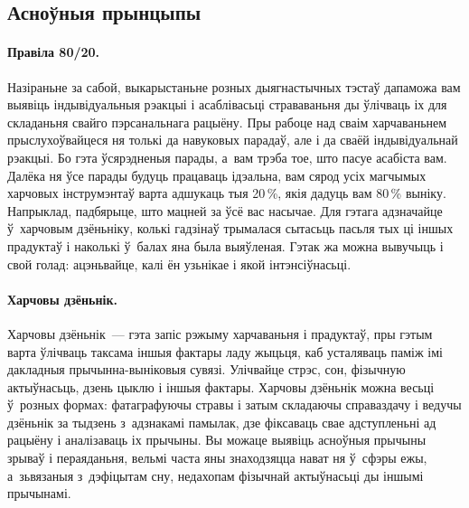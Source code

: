 \subsection{Асноўныя прынцыпы}

\paragraph{Правіла 80/20.}
Назіраньне за сабой, выкарыстаньне розных дыягнастычных тэстаў дапаможа вам выявіць індывідуальныя рэакцыі і асаблівасьці страваваньня ды ўлічваць іх для складаньня свайго пэрсанальнага рацыёну. Пры рабоце над сваім харчаваньнем прыслухоўвайцеся ня толькі да навуковых парадаў, але і да сваёй індывідуальнай рэакцыі. Бо гэта ўсярэдненыя парады, а~вам трэба тое, што пасуе асабіста вам. Далёка ня ўсе парады будуць працаваць ідэальна, вам сярод усіх магчымых харчовых інструмэнтаў варта адшукаць тыя 20\,\%, якія дадуць вам 80\,\% выніку. Напрыклад, падбярыце, што мацней за ўсё вас насычае. Для гэтага адзначайце ў~харчовым дзёньніку, колькі гадзінаў трымалася сытасьць пасьля тых ці іншых прадуктаў і наколькі ў~балах яна была выяўленая. Гэтак жа можна вывучыць і свой голад: ацэньвайце, калі ён узьнікае і якой інтэнсіўнасьці.

\paragraph{Харчовы дзёньнік.}
Харчовы дзёньнік~--- гэта запіс рэжыму харчаваньня і прадуктаў, пры гэтым варта ўлічваць таксама іншыя фактары ладу жыцьця, каб усталяваць паміж імі дакладныя прычынна-выніковыя сувязі. Улічвайце стрэс, сон, фізычную актыўнасьць, дзень цыклю і іншыя фактары. Харчовы дзёньнік можна весьці ў~розных формах: фатаграфуючы стравы і затым складаючы справаздачу і ведучы дзёньнік за тыдзень з~адзнакамі памылак, дзе фіксаваць свае адступленьні ад рацыёну і аналізаваць іх прычыны. Вы можаце выявіць асноўныя прычыны зрываў і пераяданьня, вельмі часта яны знаходзяцца нават ня ў~сфэры ежы, а~зьвязаныя з~дэфіцытам сну, недахопам фізычнай актыўнасьці ды іншымі прычынамі.


